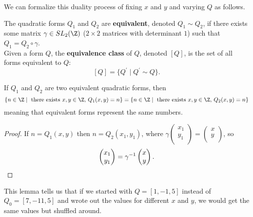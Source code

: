 \documentclass[11pt]{article}
\begin{document}
We can formalize this duality process of fixing $x$ and $y$ and varying $Q$ as follows.

\begin{definition}
The quadratic forms $Q_1$ and $Q_2$ are \textbf{equivalent}, denoted $Q_1 \sim Q_2$, if there exists some matrix
$\gamma \in SL_2(\Z)$ ($2 \times 2$ matrices with determinant $1$) such that $Q_1 = Q_2 \circ \gamma$. \\

Given a form $Q$, the \textbf{equivalence class} of $Q$, denoted $[Q]$, is the set of all forms equivalent to $Q$:
\[
    [Q] = \{ Q^{\prime}  \mid Q^{\prime} \sim Q \}. 
\]
\end{definition}

\begin{lemma}
If $Q_1$ and $Q_2$ are two equivalent quadratic forms, then
\[
    \{ n \in \Z \mid \text{ there exists } x, y \in \Z, \, Q_1(x, y) = n\} = \{ n \in \Z \mid \text{ there exists } x, y \in \Z, \, Q_2(x, y) = n\}
\]
meaning that equivalent forms represent the same numbers.
\end{lemma}

\begin{proof}
If $n = Q_1(x, y)$ then $n = Q_2(x_1, y_1)$, where $\gamma \begin{pmatrix}
    x_1 \\
    y_1 \\
\end{pmatrix} = \begin{pmatrix}
    x \\
    y \\
\end{pmatrix}$, so
\[
    \begin{pmatrix}
        x_1 \\
        y_1 \\
    \end{pmatrix} = \gamma^{-1} \begin{pmatrix}
        x \\
        y \\
    \end{pmatrix}. \qedhere
\]
\end{proof}

\begin{remark}
This lemma tells us that if we started with $Q = [1, -1, 5]$ instead of $Q_0 = [7, -11, 5]$ and wrote out the values for
different $x$ and $y$, we would get the same values but shuffled around.
\end{remark}
\end{document}
